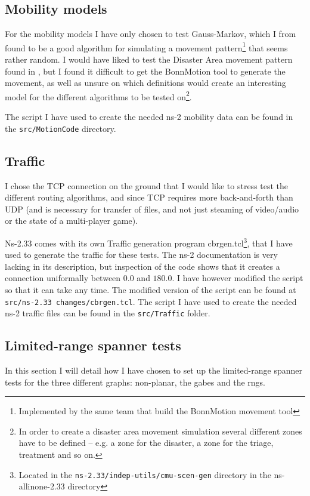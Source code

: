 \subsection{Mobility models}
\label{section:mobili-ty_model}
For the mobility models I have only chosen to test Gauss-Markov, which I from \cite{MobilityAdHocResearch} found to be a good algorithm for simulating a movement pattern\footnote{Implemented by the same team that build the BonnMotion movement tool} that seems rather random. I would have liked to test the Disaster Area movement pattern found in \cite{disasterArea}, but I found it difficult to get the BonnMotion tool to generate the movement, as well as unsure on which definitions would create an interesting model for the different algorithms to be tested on\footnote{In order to create a disaster area movement simulation several different zones have to be defined -- e.g. a zone for the disaster, a zone for the triage, treatment and so on.}. 

The script I have used to create the needed ns-2 mobility data can be found in the \texttt{src/MotionCode} directory.

\subsection{Traffic}
\label{section:traffic_model}
I chose the TCP connection on the ground that I would like to stress test the different routing algorithms, and since TCP requires more back-and-forth than UDP (and is necessary for transfer of files, and not just steaming of video/audio or the state of a multi-player game).

Ns-2.33 comes with its own Traffic generation program cbrgen.tcl\footnote{Located in the \texttt{ns-2.33/indep-utils/cmu-scen-gen} directory in the ns-allinone-2.33 directory}, that I have used to generate the traffic for these tests. The ns-2 documentation is very lacking in its description, but inspection of the code shows that it creates a connection uniformally between $0.0$ and $180.0$. I have however modified the script so that it can take any time. The modified version of the script can be found at \texttt{src/ns-2.33 changes/cbrgen.tcl}. The script I have used to create the needed ns-2 traffic files can be found in the \texttt{src/Traffic} folder.

\subsection{Limited-range spanner tests}
\label{section:test_desc_spanners}
In this section I will detail how I have chosen to set up the limited-range spanner tests for the three different graphs: non-planar, the \acp{gabe} and the \acp{rng}.

